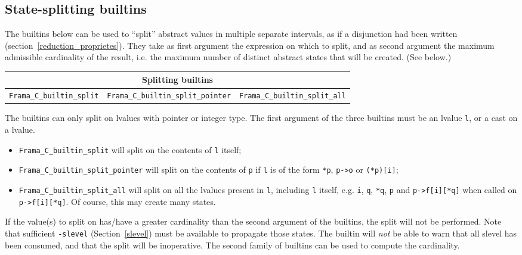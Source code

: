 \documentclass{frama-c-book}
\begin{document}
\subsection{State-splitting builtins}

The builtins below can be used to ``split'' abstract values in
multiple separate intervals, as if a disjunction had been written
(section~\ref{reduction_proprietes}). They take as
first argument the expression on which to split, and as second
argument the maximum admissible cardinality of the result, i.e. the
maximum number of distinct abstract states that will be created.
(See below.)
\begin{table}[!ht]
  \centering
  \begin{tabular}{ccc}
    \multicolumn{3}{c}{Splitting builtins} \\
    \hline
    \lstinline|Frama_C_builtin_split| &
    \lstinline|Frama_C_builtin_split_pointer| &
    \lstinline|Frama_C_builtin_split_all| \\
  \end{tabular}
\end{table}

The builtins can only split on lvalues with pointer or integer type.
The first argument of the three builtins must be an lvalue
\lstinline+l+, or a cast on a lvalue.
\begin{itemize}
\item  \lstinline+Frama_C_builtin_split+ will split on the contents of
\lstinline+l+ itself;

\item  \lstinline+Frama_C_builtin_split_pointer+ will split on the contents of
\lstinline+p+ if \lstinline+l+ is of the form \lstinline+*p+, \lstinline+p->o+
or \lstinline+(*p)[i]+;

\item \lstinline+Frama_C_builtin_split_all+ will split on all the
  lvalues present in \lstinline+l+, including \lstinline+l+ itself,
  e.g.  \lstinline+i+, \lstinline+q+, \lstinline+*q+, \lstinline+p+
  and \lstinline+p->f[i][*q]+ when called on
  \lstinline+p->f[i][*q]+. Of course, this may create many states.

\end{itemize}


If the value(s) to split on has/have a greater cardinality than the
second argument of the builtins, the split will not be performed. Note
that sufficient \texttt{-slevel} (Section~\ref{slevel}) must be
available to propagate those states. The builtin will \emph{not} be
able to warn that all slevel has been consumed, and that the split
will be inoperative.
%
The second family of builtins can be used to compute the cardinality.
\end{document}
